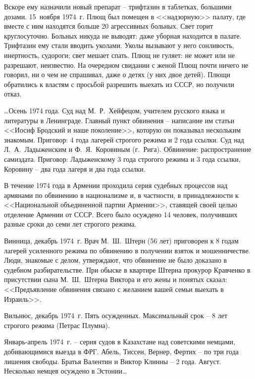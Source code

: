 \documentclass{book}
\begin{document}
Вскоре ему назначили новый препарат -- трифтазин в таблетках, большими дозами. 15~ноября 1974~г. Плющ был помещен в <<надзорную>> палату, где вместе с ним находятся больше 20 агрессивных больных. Свет горит круглосуточно. Больных никуда не выводят: даже уборная находится в палате. Трифтазин ему стали вводить уколами. Уколы вызывают у него сон­ливость, инертность, судороги; свет мешает спать. Плющ не гуляет: не может или не разрешают, неизвестно. На очередном свидании с женой Плющ почти ничего не говорил, ни о чем не спрашивал, даже о детях (у них двое детей). Плющи обрати­лись к властям с просьбой разрешить выехать из СССР, но получили отказ.

\ldots Осень 1974 года. Суд над М.~Р.~Хейфецом, учителем русского языка и литературы в Ленинграде. Главный пункт обвинения -- написание им статьи <<Иосиф Бродский и наше поколение>>, которую он показывал нескольким знакомым. Приговор: 4 года лагерей строгого режима и 2 года ссылки. Суд над Л.~А.~Ладыженским и Ф.~Я.~Коровиным (г.~Рига). Обвинение: распространение самиздата. Приговор: Ладыженскому 3 года строгого режима и 3 года ссылки, Коровину -- два года лагеря и два года ссылки.

В течение 1974 года в Армении проходила серия судебных процессов над армянами по обвинению в национализме и, в частности, в принадлежности к <<Национальной объединенной партии Армении>>, ставящей своей целью отделение Армении от СССР. Всего было осуждено 14 человек, получивших разные сроки до семи лет строгого режима.

Винница, декабрь 1974~г. Врач М.~Ш.~Штерн (56 лет) приговорен к 8 годам лагерей усиленного режима по обвинению в получении взяток и мошенничестве. Люди, знакомые с делом, утверждают, что обвинение не было доказано в судебном разбирательстве. При обыске в квартире Штерна прокурор Кравченко в присутствии сына М.~Ш.~Штерна Виктора и его жены и понятых сказал: <<Предъявление обвинения связано с желанием вашей семьи выехать в Израиль>>.

Вильнюс, декабрь 1974~г. Пять осужденных. Максимальный срок -- 8 лет строгого режима (Петрас Плумна).

Январь-апрель 1974~г. -- серия судов в Казахстане над советскими немцами, добивающимися выезда в ФРГ. Абель, Тиссен, Вернер, Фертих -- по три года лишения свободы. Братья Валентин и Виктор Клинны -- 2 года. Август. Несколько нем­цев осуждено в Эстонии\ldots
\end{document}
